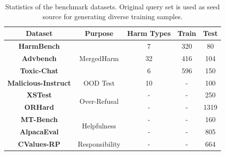 \documentclass[11pt]{article}
\begin{document}
\begin{table} [H]
\fontsize{8pt}{9.6pt}\selectfont
    \centering
    \setlength\tabcolsep{1.5pt}
  \begin{tabular}{c|c|c|c|c}
  \toprule
  \textbf{Dataset} & \textbf{Purpose}  & \textbf{Harm Types} & \textbf{Train} & \textbf{Test}\\
  \midrule
  \textbf{HarmBench} & & 7 & 320 &80 \\
  \textbf{Advbench} & MergedHarm & 32 & 416 & 104 \\
  \textbf{Toxic-Chat} & & 6 & 596 & 150 \\
  \midrule
  \textbf{Malicious-Instruct} & OOD Test & 10 &- &100\\

  \midrule
  \textbf{XSTest} & \multirow{2}{*}{Over-Refusal} & - & - &250 \\
  \textbf{ORHard} & & - & - &1319\\
  \midrule
  
  \textbf{MT-Bench} & \multirow{2}{*}{Helpfulness} & - &- & 160\\
  \textbf{AlpacaEval} & & - & - & 805\\

  \midrule
  \textbf{CValues-RP} & Responsibility & - &- & 664\\
 
  \bottomrule
\end{tabular} 
\caption{Statistics of the benchmark datasets. Original query set is used as seed source for generating diverse training samples.%
}
\label{tab:datadesc}
\end{table} 
\end{document}
